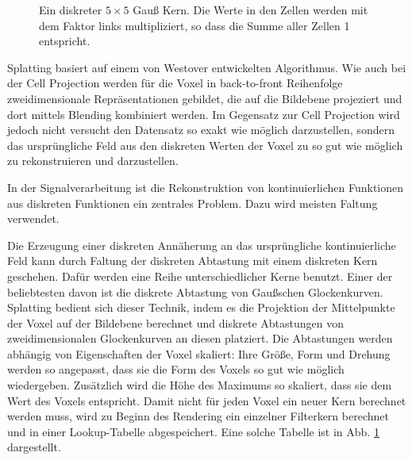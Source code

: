 \documentclass[a4paper,fontsize=12pt,toc=bib,halfparskip]{scrartcl}
\begin{document}
\begin{figure}
	\centering
	\caption{Ein diskreter $5\times5$ Gau{\ss} Kern. Die Werte in den Zellen werden mit dem Faktor links multipliziert, so dass die Summe aller Zellen 1 entspricht.}
	\label{kernel}
\end{figure}

Splatting basiert auf einem von Westover entwickelten Algorithmus\cite{westover1989interactive}\cite{westover1990footprint}. Wie auch bei der Cell Projection werden f\"ur die Voxel in back-to-front Reihenfolge zweidimensionale Repr\"asentationen gebildet, die auf die Bildebene projeziert und dort mittels Blending kombiniert werden. Im Gegensatz zur Cell Projection wird jedoch nicht versucht den Datensatz so exakt wie m\"oglich darzustellen, sondern das urspr\"ungliche Feld aus den diskreten Werten der Voxel zu so gut wie m\"oglich zu rekonstruieren und darzustellen. 

In der Signalverarbeitung ist die Rekonstruktion von kontinuierlichen Funktionen aus diskreten Funktionen ein zentrales Problem. Dazu wird meisten Faltung verwendet. 

Die Erzeugung einer diskreten Ann\"aherung an das urspr\"ungliche kontinuierliche Feld kann durch Faltung der diskreten Abtastung mit einem diskreten Kern geschehen. Daf\"ur werden eine Reihe unterschiedlicher Kerne benutzt. Einer der beliebtesten davon ist die diskrete Abtastung von Gau{\ss}schen Glockenkurven. Splatting bedient sich dieser Technik, indem es die Projektion der Mittelpunkte der Voxel auf der Bildebene berechnet und diskrete Abtastungen von zweidimensionalen Glockenkurven an diesen platziert. Die Abtastungen werden abh\"angig von Eigenschaften der Voxel skaliert: Ihre Gr\"o{\ss}e, Form und Drehung werden so angepasst, dass sie die Form des Voxels so gut wie m\"oglich wiedergeben. Zus\"atzlich wird die H\"ohe des Maximums so skaliert, dass sie dem Wert des Voxels entspricht. Damit nicht f\"ur jeden Voxel ein neuer Kern berechnet werden muss, wird zu Beginn des Rendering ein einzelner Filterkern berechnet und in einer Lookup-Tabelle abgespeichert. Eine solche Tabelle ist in Abb. \ref{kernel} dargestellt.
\end{document}

